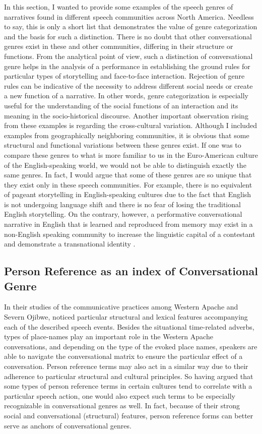 \documentclass[12pt]{article}
\begin{document}
In this section, I wanted to provide some examples of the speech genres of narratives found in different speech communities across North America. Needless to say, this is only a short list that demonstrates the value of genre categorization and the basis for such a distinction. There is no doubt that other conversational genres exist in these and other communities, differing in their structure or functions. From the analytical point of view, such a distinction of conversational genre helps in the analysis of a performance in establishing the ground rules for particular types of storytelling and face-to-face interaction. Rejection of genre rules can be indicative of the necessity to address different social needs or create a new function of a narrative. In other words, genre categorization is especially useful for the understanding of the social functions of an interaction and its meaning in the socio-historical discourse. Another important observation rising from these examples is regarding the cross-cultural variation. Although I included examples from geographically neighboring communities, it is obvious that some structural and functional variations between these genres exist. If one was to compare these genres to what is more familiar to us in the Euro-American culture of the English-speaking world, we would not be able to distinguish exactly the same genres. In fact, I would argue that some of these genres are so unique that they exist only in these speech communities. For example, there is no equivalent of pageant storytelling in English-speaking cultures due to the fact that English is not undergoing language shift and there is no fear of losing the traditional English storytelling. On the contrary, however, a performative conversational narrative in English that is learned and reproduced from memory may exist in a non-English speaking community to increase the linguistic capital of a contestant and demonstrate a transnational identity \parencite{billings2009}. 
\subsection{Person Reference as an index of Conversational Genre}
In their studies of the communicative practices among Western Apache and Severn Ojibwe, \textcite{basso1996,basso1990,valentine1995,samuels2004} noticed particular structural and lexical features accompanying each of the described speech events. Besides the situational time-related adverbs, types of place-names play an important role in the Western Apache conversations, and depending on the type of the evoked place names, speakers are able to navigate the conversational matrix to ensure the particular effect of a conversation. Person reference terms may also act in a similar way due to their adherence to particular structural and cultural principles. So having argued that some types of person reference terms in certain cultures tend to correlate with a particular speech action, one would also expect such terms to be especially recognizable in conversational genres as well. In fact, because of their strong social and conversational (structural) features, person reference forms can better serve as anchors of conversational genres.
\end{document}
